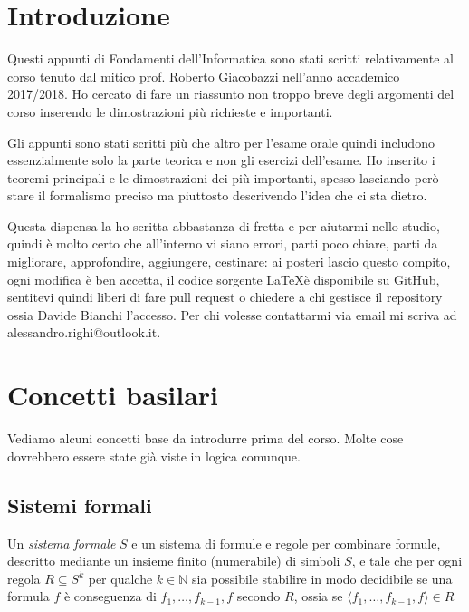 \documentclass[a4paper,titlepage]{article}
\theoremstyle{definition}
\newcommand{\N}{\mathbb{N}}
\begin{document}
	
\begin{frontespizio}
	\Preambolo{\usepackage{datetime}}
\end{frontespizio}

\tableofcontents
\newpage

\section{Introduzione}
Questi appunti di Fondamenti dell'Informatica sono stati scritti relativamente al corso tenuto dal mitico prof. Roberto Giacobazzi nell'anno accademico 2017/2018. Ho cercato di fare un riassunto non troppo breve degli argomenti del corso inserendo le dimostrazioni più richieste e importanti. 

Gli appunti sono stati scritti più che altro per l'esame orale quindi includono essenzialmente solo la parte teorica e non gli esercizi dell'esame. Ho inserito i teoremi principali e le dimostrazioni dei più importanti, spesso lasciando però stare il formalismo preciso ma piuttosto descrivendo l'idea che ci sta dietro. 

Questa dispensa la ho scritta abbastanza di fretta e per aiutarmi nello studio, quindi è molto certo che all'interno vi siano errori, parti poco chiare, parti da migliorare,  approfondire, aggiungere, cestinare: ai posteri lascio questo compito, ogni modifica è ben accetta, il codice sorgente \LaTeX è disponibile su GitHub, sentitevi quindi liberi di fare pull request o chiedere a chi gestisce il repository ossia Davide Bianchi l'accesso. Per chi volesse contattarmi via email mi scriva ad alessandro.righi@outlook.it.

\section{Concetti basilari}
Vediamo alcuni concetti base da introdurre prima del corso. Molte cose dovrebbero essere state già viste in logica comunque. 

\subsection{Sistemi formali}
Un \textit{sistema formale} $S$ e un sistema di formule e regole per combinare formule, descritto mediante un insieme finito (numerabile) di simboli $S$, e tale che per ogni regola $R\subseteq S^k$ per qualche $k\in\N$ sia possibile stabilire in modo decidibile se una formula $f$ è conseguenza di $f_1,\dots,f_{k-1},f$ secondo $R$, ossia se $\langle f_1,\dots,f_{k-1},f\rangle\in R$ 
\end{document}
